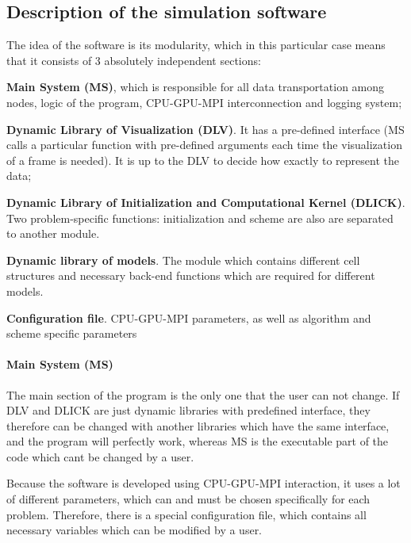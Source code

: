 \subsection*{Description of the simulation software}

The idea of the software is its modularity, which in this particular case means that it consists of 3 absolutely independent sections\+:


\begin{DoxyItemize}
\item {\bfseries Main System (MS)}, which is responsible for all data transportation among nodes, logic of the program, C\+P\+U-\/\+G\+P\+U-\/\+M\+PI interconnection and logging system;
\item {\bfseries Dynamic Library of Visualization (D\+LV)}. It has a pre-\/defined interface (MS calls a particular function with pre-\/defined arguments each time the visualization of a frame is needed). It is up to the D\+LV to decide how exactly to represent the data;
\item {\bfseries Dynamic Library of Initialization and Computational Kernel (D\+L\+I\+CK)}. Two problem-\/specific functions\+: initialization and scheme are also are separated to another module.
\item {\bfseries Dynamic library of models}. The module which contains different cell structures and necessary back-\/end functions which are required for different models.
\item {\bfseries Configuration file}. C\+P\+U-\/\+G\+P\+U-\/\+M\+PI parameters, as well as algorithm and scheme specific parameters
\end{DoxyItemize}



\paragraph*{Main System (MS)}

The main section of the program is the only one that the user can not change. If D\+LV and D\+L\+I\+CK are just dynamic libraries with predefined interface, they therefore can be changed with another libraries which have the same interface, and the program will perfectly work, whereas MS is the executable part of the code which can\textquotesingle{}t be changed by a user.

Because the software is developed using C\+P\+U-\/\+G\+P\+U-\/\+M\+PI interaction, it uses a lot of different parameters, which can and must be chosen specifically for each problem. Therefore, there is a special configuration file, which contains all necessary variables which can be modified by a user.

